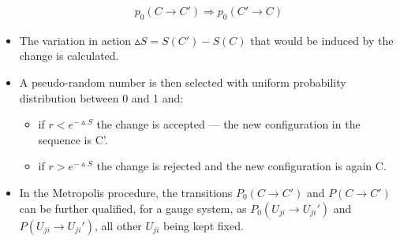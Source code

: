 \documentclass[]{article}
\numberwithin{equation}{section}
\begin{document}
\begin{itemize}
    \begin{align}
        p_0(C\longrightarrow C')\Longrightarrow p_0(C'\longrightarrow C)
    \end{align}
    \item The variation in action $\vartriangle S=S(C')-S(C)$ that would be induced by the change is calculated. 
    \item A pseudo-random number is then selected with uniform probability distribution between 0 and 1 and: 
    \begin{itemize}
        \item if $r < e^{-\vartriangle S}$ the change is accepted — the new configuration in the sequence is C'.
        \item if $r > e^{-\vartriangle S}$ the change is rejected and the new configuration is again C.
    \end{itemize}
    \item In the Metropolis procedure, the transitions $P_0(C\longrightarrow C')$ and $P(C\longrightarrow C')$ can be further qualified, for a gauge system, as $P_0(U_{ji}\longrightarrow U_{ji}')$ and $P(U_{ji}\longrightarrow U_{ji}')$, all other $U_{ji}$ being kept fixed. 
\end{itemize}
\end{document}
